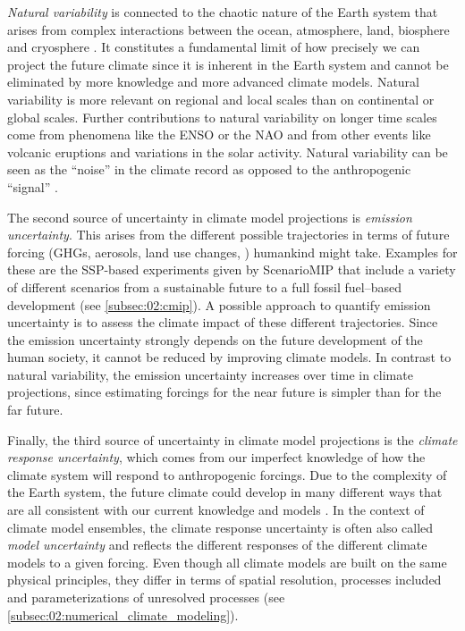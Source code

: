 \emph{Natural variability} is connected to the chaotic nature of the Earth
system that arises from complex interactions between the ocean, atmosphere,
land, biosphere and cryosphere \autocite{Cubasch2013}. It constitutes a
fundamental limit of how precisely we can project the future climate since it
is inherent in the Earth system and cannot be eliminated by more knowledge and
more advanced climate models. Natural variability is more relevant on regional
and local scales than on continental or global scales. Further contributions to
natural variability on longer time scales come from phenomena like the
\ac{ENSO} or the \ac{NAO} and from other events like volcanic eruptions and
variations in the solar activity. Natural variability can be seen as the
\enquote{noise} in the climate record as opposed to the anthropogenic
\enquote{signal} \autocite{Cubasch2013}.

The second source of uncertainty in climate model projections is \emph{emission
  uncertainty}. This arises from the different possible trajectories in terms
of future forcing (\acp{GHG}, aerosols, land use changes, \etc{}) humankind
might take. Examples for these are the \ac{SSP}-based experiments given by
\ac{ScenarioMIP} that include a variety of different scenarios from a
sustainable future to a full fossil fuel--based development (see
\cref{subsec:02:cmip}). A possible approach to quantify emission uncertainty is
to assess the climate impact of these different trajectories. Since the
emission uncertainty strongly depends on the future development of the human
society, it cannot be reduced by improving climate models. In contrast to
natural variability, the emission uncertainty increases over time in climate
projections, since estimating forcings for the near future is simpler than for
the far future.

Finally, the third source of uncertainty in climate model projections is the
\emph{climate response uncertainty}, which comes from our imperfect knowledge
of how the climate system will respond to anthropogenic forcings. Due to the
complexity of the Earth system, the future climate could develop in many
different ways that are all consistent with our current knowledge and models
\autocite{Cubasch2013}. In the context of climate model ensembles, the climate
response uncertainty is often also called \emph{model uncertainty} and reflects
the different responses of the different climate models to a given forcing.
Even though all climate models are built on the same physical principles, they
differ in terms of spatial resolution, processes included and parameterizations
of unresolved processes (see \cref{subsec:02:numerical_climate_modeling}).


